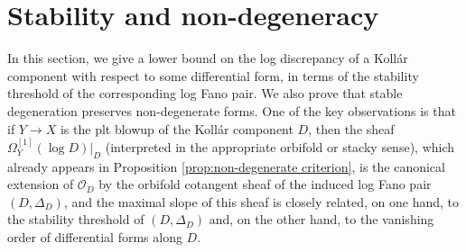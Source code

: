 \documentclass[12pt]{amsart}
\newtheorem{thm}[prop]{Theorem}
\theoremstyle{definition}
\newcommand{\cO}{\mathcal{O}}
\numberwithin{equation}{section}
\begin{document}




\section{Stability and non-degeneracy}\label{s-canonical}

In this section, we give a lower bound on the log discrepancy of a Koll\'ar component with respect to some differential form, in terms of the stability threshold of the corresponding log Fano pair. We also prove that stable degeneration preserves non-degenerate forms. One of the key observations is that if $Y\to X$ is the plt blowup of the Koll\'ar component $D$, then the sheaf $\Omega_Y^{[1]}(\log D)|_D$ (interpreted in the appropriate orbifold or stacky sense), which already appears in Proposition \ref{prop:non-degenerate criterion}, is the canonical extension of $\cO_D$ by the orbifold cotangent sheaf of the induced log Fano pair $(D,\Delta_D)$, and the maximal slope of this sheaf is closely related, on one hand, to the stability threshold of $(D,\Delta_D)$ and, on the other hand, to the vanishing order of differential forms along $D$.


\end{document}
